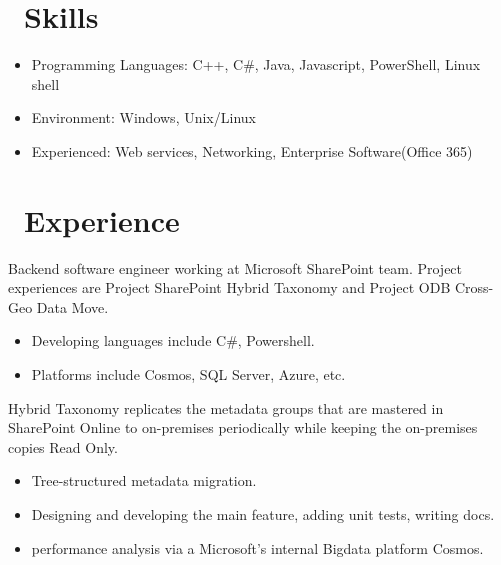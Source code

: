 \documentclass{resume}
\begin{document}



\section{\faCogs\ Skills}
\begin{itemize}[parsep=0.5ex]
  \item Programming Languages: C++, C\#, Java, Javascript, PowerShell, Linux shell
  \item Environment: Windows, Unix/Linux
  \item Experienced: Web services, Networking, Enterprise Software(Office 365)
\end{itemize}

\section{\faUsers\ Experience}
Backend software engineer working at Microsoft SharePoint team. Project experiences are Project SharePoint Hybrid Taxonomy and Project ODB Cross-Geo Data Move.
\begin{itemize}
\item Developing languages include C\#, Powershell.
\item Platforms include Cosmos, SQL Server, Azure, etc.
\end{itemize}

Hybrid Taxonomy replicates the metadata groups that are mastered in SharePoint Online to on-premises periodically
while keeping the on-premises copies Read Only.
\begin{itemize}
  \item Tree-structured metadata migration.
  \item Designing and developing the main feature, adding unit tests, writing docs.
  \item performance analysis via a Microsoft's internal Bigdata platform Cosmos.
\end{itemize}
\end{document}

